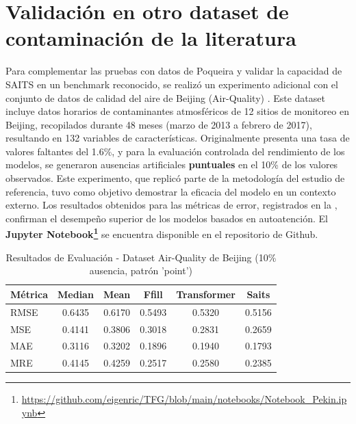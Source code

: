 
\section{Validación en otro dataset de contaminación de la literatura}

Para complementar las pruebas con datos de Poqueira y validar la capacidad de SAITS en un benchmark reconocido, se realizó un experimento adicional con el conjunto de datos de calidad del aire de Beijing (Air-Quality) \citep[cf.][]{Du2023SAITS}. Este dataset incluye datos horarios de contaminantes atmosféricos de 12 sitios de monitoreo en Beijing, recopilados durante 48 meses (marzo de 2013 a febrero de 2017), resultando en 132 variables de características. Originalmente presenta una tasa de valores faltantes del 1.6\%, y para la evaluación controlada del rendimiento de los modelos, se generaron ausencias artificiales \textbf{puntuales} en el 10\% de los valores observados. Este experimento, que replicó parte de la metodología del estudio de referencia, tuvo como objetivo demostrar la eficacia del modelo en un contexto externo. Los resultados obtenidos para las métricas de error, registrados en la , confirman el desempeño superior de los modelos basados en autoatención. El \textbf{Jupyter Notebook\footnote{\url{https://github.com/eigenric/TFG/blob/main/notebooks/Notebook_Pekin.ipynb}}} se encuentra disponible en el repositorio de Github.

\begin{table}[htbp]
\centering
\caption{Resultados de Evaluación - Dataset Air-Quality de Beijing (10\% ausencia, patrón 'point')}
\label{tab:resultados_pekin_eval}
\begin{tabular}{l*{5}{S[table-format=1.4]}}
\toprule
\textbf{Métrica} & \textbf{Median} & \textbf{Mean} & \textbf{Ffill} & \textbf{Transformer} & \textbf{Saits} \\
\midrule
RMSE & 0.6435 & 0.6170 & 0.5493 & 0.5320 & 0.5156 \\
MSE  & 0.4141 & 0.3806 & 0.3018 & 0.2831 & 0.2659 \\
MAE  & 0.3116 & 0.3202 & 0.1896 & 0.1940 & 0.1793 \\
MRE  & 0.4145 & 0.4259 & 0.2517 & 0.2580 & 0.2385 \\
\bottomrule
\end{tabular}
\end{table}


